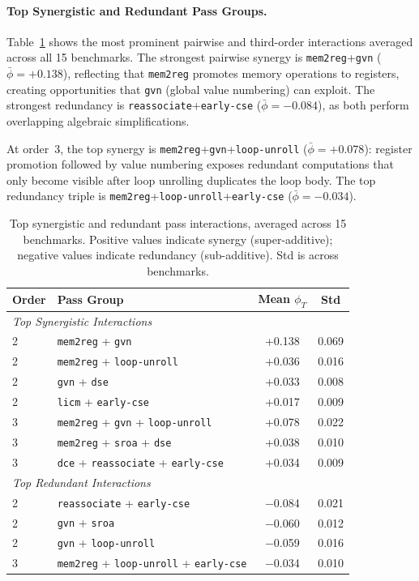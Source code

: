 \documentclass[preprint]{article}
\newcommand{\shapval}{\phi}
\begin{document}
\paragraph{Top Synergistic and Redundant Pass Groups.}
Table~\ref{tab:interactions} shows the most prominent pairwise and third-order interactions averaged across all 15 benchmarks. The strongest pairwise synergy is \texttt{mem2reg}+\texttt{gvn} ($\bar{\shapval} = +0.138$), reflecting that \texttt{mem2reg} promotes memory operations to registers, creating opportunities that \texttt{gvn} (global value numbering) can exploit. The strongest redundancy is \texttt{reassociate}+\texttt{early-cse} ($\bar{\shapval} = -0.084$), as both perform overlapping algebraic simplifications.

At order~3, the top synergy is \texttt{mem2reg}+\texttt{gvn}+\texttt{loop-unroll} ($\bar{\shapval} = +0.078$): register promotion followed by value numbering exposes redundant computations that only become visible after loop unrolling duplicates the loop body. The top redundancy triple is \texttt{mem2reg}+\texttt{loop-unroll}+\texttt{early-cse} ($\bar{\shapval} = -0.034$).

\begin{table}[t]
\caption{Top synergistic and redundant pass interactions, averaged across 15 benchmarks. Positive values indicate synergy (super-additive); negative values indicate redundancy (sub-additive). Std is across benchmarks.}
\label{tab:interactions}
\centering
\small
\begin{tabular}{llcc}
\toprule
Order & Pass Group & Mean $\shapval_T$ & Std \\
\midrule
\multicolumn{4}{l}{\emph{Top Synergistic Interactions}} \\
2 & \texttt{mem2reg} + \texttt{gvn} & +0.138 & 0.069 \\
2 & \texttt{mem2reg} + \texttt{loop-unroll} & +0.036 & 0.016 \\
2 & \texttt{gvn} + \texttt{dse} & +0.033 & 0.008 \\
2 & \texttt{licm} + \texttt{early-cse} & +0.017 & 0.009 \\
3 & \texttt{mem2reg} + \texttt{gvn} + \texttt{loop-unroll} & +0.078 & 0.022 \\
3 & \texttt{mem2reg} + \texttt{sroa} + \texttt{dse} & +0.038 & 0.010 \\
3 & \texttt{dce} + \texttt{reassociate} + \texttt{early-cse} & +0.034 & 0.009 \\
\midrule
\multicolumn{4}{l}{\emph{Top Redundant Interactions}} \\
2 & \texttt{reassociate} + \texttt{early-cse} & $-$0.084 & 0.021 \\
2 & \texttt{gvn} + \texttt{sroa} & $-$0.060 & 0.012 \\
2 & \texttt{gvn} + \texttt{loop-unroll} & $-$0.059 & 0.016 \\
3 & \texttt{mem2reg} + \texttt{loop-unroll} + \texttt{early-cse} & $-$0.034 & 0.010 \\
\bottomrule
\end{tabular}
\end{table}
\end{document}
